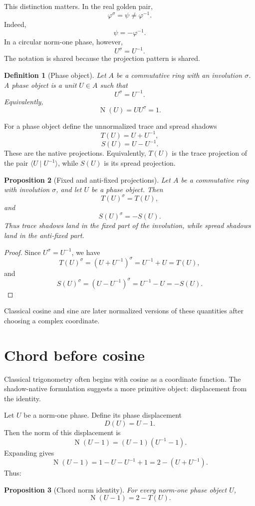 \documentclass[11pt]{article}
\newtheorem{definition}{Definition}[section]
\newtheorem{proposition}[definition]{Proposition}
\newcommand{\Nm}{\operatorname{N}}
\newcommand{\ph}{\varphi}
\newcommand{\ps}{\psi}
\newcommand{\sig}{\sigma}
\begin{document}
This distinction matters.  In the real golden pair,
\[
    \ph^\sig=\ps\ne \ph^{-1}.
\]
Indeed,
\[
    \ps=-\ph^{-1}.
\]
In a circular norm-one phase, however,
\[
    U^\sig=U^{-1}.
\]
The notation is shared because the projection pattern is shared.

\begin{definition}[Phase object]
Let $A$ be a commutative ring with an involution $\sig$.  A phase object is a unit $U\in A$ such that
\[
    U^\sig=U^{-1}.
\]
Equivalently,
\[
    \Nm(U)=UU^\sig=1.
\]
\end{definition}

For a phase object define the unnormalized trace and spread shadows
\[
    T(U)=U+U^{-1},
\]
\[
    S(U)=U-U^{-1}.
\]
These are the native projections.  Equivalently, $T(U)$ is the trace projection of the pair $\langle U\mid U^{-1}\rangle$, while $S(U)$ is its spread projection.

\begin{proposition}[Fixed and anti-fixed projections]\label{prop:fixed-antifixed}
Let $A$ be a commutative ring with involution $\sig$, and let $U$ be a phase object.  Then
\[
    T(U)^\sig=T(U),
\]
and
\[
    S(U)^\sig=-S(U).
\]
Thus trace shadows land in the fixed part of the involution, while spread shadows land in the anti-fixed part.
\end{proposition}

\begin{proof}
Since $U^\sig=U^{-1}$, we have
\[
    T(U)^\sig=(U+U^{-1})^\sig=U^{-1}+U=T(U),
\]
and
\[
    S(U)^\sig=(U-U^{-1})^\sig=U^{-1}-U=-S(U).
\]
\end{proof}

Classical cosine and sine are later normalized versions of these quantities after choosing a complex coordinate.

\section{Chord before cosine}

Classical trigonometry often begins with cosine as a coordinate function.  The shadow-native formulation suggests a more primitive object: displacement from the identity.

Let $U$ be a norm-one phase.  Define its phase displacement
\[
    D(U)=U-1.
\]
Then the norm of this displacement is
\[
    \Nm(U-1)=(U-1)(U^{-1}-1).
\]
Expanding gives
\[
    \Nm(U-1)
    =1-U-U^{-1}+1
    =2-(U+U^{-1}).
\]
Thus:

\begin{proposition}[Chord norm identity]\label{prop:chord}
For every norm-one phase object $U$,
\[
    \Nm(U-1)=2-T(U).
\]
\end{proposition}
\end{document}
